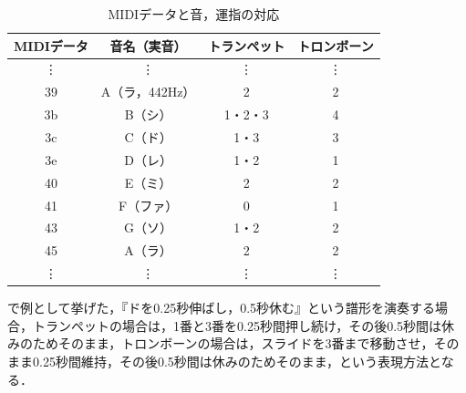 \begin{table}[h]
	\centering
	\caption{MIDIデータと音，運指の対応}
	\begin{tabular}{|c|c|c|c|} \hline
		MIDIデータ & 音名（実音） & トランペット & トロンボーン \\ \hline \hline
		\vdots & \vdots & \vdots & \vdots \\ \hline
		39 & A（ラ，442Hz） & 2 & 2 \\ \hline
		3b & B（シ） & 1・2・3 & 4 \\ \hline
		3c & C（ド） & 1・3 & 3 \\ \hline
		3e & D（レ） & 1・2 & 1 \\ \hline
		40 & E（ミ） & 2 & 2 \\ \hline
		41 & F（ファ） & 0 & 1 \\ \hline
		43 & G（ソ） & 1・2 & 2 \\ \hline
		45 & A（ラ） & 2 & 2 \\ \hline
		\vdots & \vdots & \vdots & \vdots \\ \hline
	\end{tabular}
	\label{tab:map}
\end{table}

\secref{}で例として挙げた，『ドを0.25秒伸ばし，0.5秒休む』という譜形を演奏する場合，トランペットの場合は，1番と3番を0.25秒間押し続け，その後0.5秒間は休みのためそのまま，トロンボーンの場合は，スライドを3番まで移動させ，そのまま0.25秒間維持，その後0.5秒間は休みのためそのまま，という表現方法となる．\\

